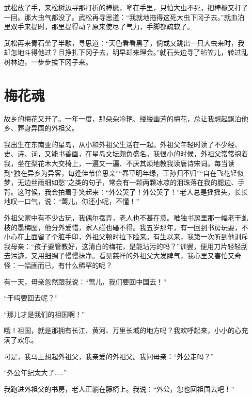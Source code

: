 \documentclass[12pt,UTF-8,openany]{ctexbook}
\begin{document}
\begin{large}
    武松放了手，来松树边寻那打折的棒橛，拿在手里，只怕大虫不死，把棒橛又打了一回。那大虫气都没了。武松再寻思道：“我就地拖得这死大虫下冈子去。”就血泊里双手来提时，那里提得动？原来使尽了气力，手脚都疏软了。
    
    武松再来青石坐了半歇，寻思道：“天色看看黑了，倘或又跳出一只大虫来时，我却怎地斗得他过？且挣扎下冈子去，明早却来理会。”就石头边寻了毡笠儿，转过乱树林边，一步步挨下冈子来。
    
\end{large}



\chapter{梅花魂}

\begin{large}
    
    故乡的梅花又开了。一年一度，那朵朵冷艳、缕缕幽芳的梅花，总让我想起飘泊他乡、葬身异国的外祖父。
    
    我出生在东南亚的星岛，从小和外祖父生活在一起。外祖父年轻时读了不少经、史、诗、词，又能书善画，在星岛文坛颇负盛名。我很小的时候，外祖父常常抱着我，坐在梨花木大交椅上，一遍又一遍、不厌其烦地教我读唐诗宋词。每当读到“独在异乡为异客，每逢佳节倍思亲”“春草明年绿，王孙归不归”“自在飞花轻似梦，无边丝雨细如愁”之类的句子，常会有一颗两颗冰凉的泪珠落在我的腮边、手背。这时候，我会拍着手笑起来：“外公哭了！外公哭了！”老人总是摇摇头，长长地叹一口气，说：“莺儿，你还小呢，不懂！”
    
    外祖父家中有不少古玩，我偶尔摆弄，老人也不甚在意。唯独书房里那一幅老干虬枝的墨梅图，他分外爱惜，家人碰也碰不得。我五岁那年，有一回到书房玩耍，不小心在上面留了个脏手印，外祖父顿时拉下脸来。有生以来，我第一次听到他训斥我母亲：“孩子要管教好，这清白的梅花，是能玷污的吗？”训罢，便用刀片轻轻刮去污迹，又用细绸子慢慢抹净。看见慈祥的外祖父大发脾气，我心里又害怕又奇怪：一幅画而已，有什么稀罕的呢？
    
    有一天，母亲忽然跟我说：“莺儿，我们要回中国去！”
    
    “干吗要回去呢？”
    
    “那儿才是我们的祖国啊！”
    
    哦！祖国，就是那拥有长江、黄河、万里长城的地方吗？我欢呼起来，小小的心充满了欢乐。
    
    可是，我马上想起外祖父，我亲爱的外祖父。我问母亲：“外公走吗？”
    
    “外公年纪太大了……”
    
    我跑进外祖父的书房，老人正躺在藤椅上。我说：“外公，您也回祖国去吧！”
    

\end{large}
\end{document}
